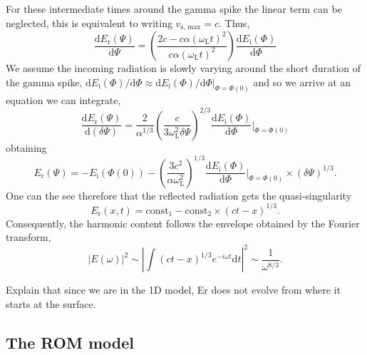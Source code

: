 For these intermediate times around the gamma spike the linear term can be neglected, this is equivalent to writing $v_\mathrm{s,\, max} = c$. Thus,
\begin{equation}
	\frac{\mathrm{d}E_\mathrm{r}(\Psi)}{\mathrm{d}\Psi} = \left(\frac{2c - c\alpha (\omega_\mathrm{L}t)^2}{c\alpha (\omega_\mathrm{L}t)^2}\right)\frac{\mathrm{d}E_\mathrm{i}(\Phi)}{\mathrm{d}\Phi}
\end{equation}
We assume the incoming radiation is slowly varying around the short duration of the gamma spike, $\mathrm{d}E_\mathrm{i}(\Phi)/\mathrm{d}\Phi \approx \mathrm{d}E_\mathrm{i}(\Phi)/\mathrm{d}\Phi|_{\Phi = \Phi(0)}$ and so we arrive at an equation we can integrate,
\begin{equation}
	\frac{\mathrm{d}E_\mathrm{r}(\Psi)}{\mathrm{d}(\delta \Psi)} = \frac{2}{\alpha^{1/3}} \left(\frac{c}{3\omega_\mathrm{L}^2 \delta \Psi}\right)^{2/3}\frac{\mathrm{d}E_\mathrm{i}(\Phi)}{\mathrm{d}\Phi}|_{\Phi = \Phi(0)}
\end{equation}
obtaining
\begin{equation}
	E_\mathrm{r}(\Psi) = -E_\mathrm{i}(\Phi(0)) - \left(\frac{3c^2}{\alpha \omega_\mathrm{L}^2}\right)^{1/3}\frac{\mathrm{d}E_\mathrm{i}(\Phi)}{\mathrm{d}\Phi}|_{\Phi = \Phi(0)} \times (\delta \Psi)^{1/3}.
\end{equation}
One can the see therefore that the reflected radiation gets the quasi-singularity
\begin{equation}
	E_\mathrm{r}(x,t) = \mathrm{const}_1 - \mathrm{const_2}\times (ct - x)^{1/3}.
\end{equation}
Consequently, the harmonic content follows the envelope obtained by the Fourier transform,
\begin{equation}
	|E(\omega)|^2 \sim \left|\int (ct-x)^{1/3}e^{-i\omega t} \mathrm{d} t\right|^2 \sim \frac{1}{\omega^{8/3}}.
\end{equation}

Explain that since we are in the 1D model, Er does not evolve from where it starts at the surface.
\subsection{The ROM model}

